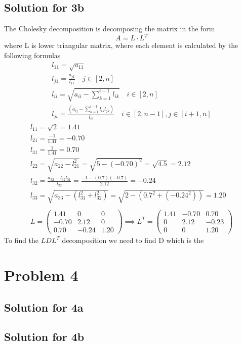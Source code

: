 \documentclass[a4paper,fleqn,12pt]{article}
\begin{document}
\subsection{Solution for 3b}
The Cholesky decomposition is decomposing the matrix in the form 
$$
A = L \cdot L^T
$$
where L is lower triangular matrix, where each element is calculated by the following formulas
\begin{gather*}
l_{11} = \sqrt{a_{11}}   \\
l_{j1} = \frac{a_{j1}}{l_{11}} \quad  j \in [2, n] \\
l_{ii} = \sqrt{a_{ii} - \sum_{k=1} ^{i-1} l_{ik}} \quad i \in [2, n] \\
l_{ji} = \frac{ \left( a_{ij} - \sum_{k=1} ^{i-1} l_{ik} l_{jk} \right)}{l_{ii}} \quad i \in [2, n-1], j \in [i+1, n]
\end{gather*}
\newpage
\begin{gather*}
l_{11} = \sqrt{2} = 1.41 \\
l_{21} = \frac{-1}{1.41} = - 0.70 \\
l_{31} = \frac{1}{1.41}  = 0.70 \\
l_{22} = \sqrt{a_{22} - l_{21} ^2} = \sqrt{5 - (-0.70)^2} = \sqrt{4.5} = 2.12 \\
l_{32} = \frac{a_{32} - l_{32}l_{31}}{l_{22}} = \frac{-1 -(0.7)(-0.7)}{2.12} = -0.24 \\
l_{33} = \sqrt{a_{33} - (l_{31} ^2 + l_{32} ^2)} = \sqrt{2 - (0.7^2 + (-0.24^2))} = 1.20\\
\\
L = 
\begin{pmatrix}
1.41 & 0 & 0 \\
-0.70 & 2.12 & 0 \\
0.70 & -0.24 & 1.20 
\end{pmatrix} \implies  
L^T = \begin{pmatrix}
1.41 & -0.70 & 0.70 \\
0 & 2.12 & -0.23 \\
0 & 0 & 1.20
\end{pmatrix}
\end{gather*}
To find the $LDL^T$ decomposition we need to find D which is the 
\newpage

\section{Problem 4}
\subsection{Solution for 4a}
\subsection{Solution for 4b}
\end{document}
